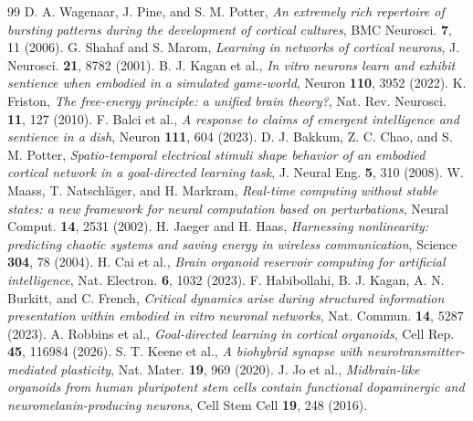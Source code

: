 \begin{thebibliography}{99}
 D. A. Wagenaar, J. Pine, and S. M. Potter, \emph{An extremely rich repertoire of bursting patterns during the development of cortical cultures}, BMC Neurosci. \textbf{7}, 11 (2006).
 G. Shahaf and S. Marom, \emph{Learning in networks of cortical neurons}, J. Neurosci. \textbf{21}, 8782 (2001).
 B. J. Kagan et al., \emph{In vitro neurons learn and exhibit sentience when embodied in a simulated game-world}, Neuron \textbf{110}, 3952 (2022).
 K. Friston, \emph{The free-energy principle: a unified brain theory?}, Nat. Rev. Neurosci. \textbf{11}, 127 (2010).
 F. Balci et al., \emph{A response to claims of emergent intelligence and sentience in a dish}, Neuron \textbf{111}, 604 (2023).
 D. J. Bakkum, Z. C. Chao, and S. M. Potter, \emph{Spatio-temporal electrical stimuli shape behavior of an embodied cortical network in a goal-directed learning task}, J. Neural Eng. \textbf{5}, 310 (2008).
 W. Maass, T. Natschl\"ager, and H. Markram, \emph{Real-time computing without stable states: a new framework for neural computation based on perturbations}, Neural Comput. \textbf{14}, 2531 (2002).
 H. Jaeger and H. Haas, \emph{Harnessing nonlinearity: predicting chaotic systems and saving energy in wireless communication}, Science \textbf{304}, 78 (2004).
 H. Cai et al., \emph{Brain organoid reservoir computing for artificial intelligence}, Nat. Electron. \textbf{6}, 1032 (2023).
 F. Habibollahi, B. J. Kagan, A. N. Burkitt, and C. French, \emph{Critical dynamics arise during structured information presentation within embodied in vitro neuronal networks}, Nat. Commun. \textbf{14}, 5287 (2023).
 A. Robbins et al., \emph{Goal-directed learning in cortical organoids}, Cell Rep. \textbf{45}, 116984 (2026).
 S. T. Keene et al., \emph{A biohybrid synapse with neurotransmitter-mediated plasticity}, Nat. Mater. \textbf{19}, 969 (2020).
 J. Jo et al., \emph{Midbrain-like organoids from human pluripotent stem cells contain functional dopaminergic and neuromelanin-producing neurons}, Cell Stem Cell \textbf{19}, 248 (2016).























\end{thebibliography}
